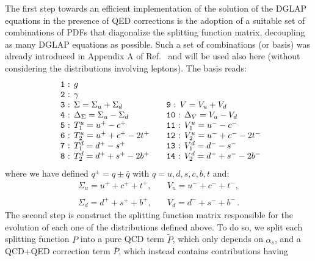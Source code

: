The first step towards an efficient implementation of the solution of
the DGLAP equations in the presence of QED corrections is the adoption
of a suitable set of combinations of PDFs that diagonalize the
splitting function matrix, decoupling as many DGLAP equations as
possible. Such a set of combinations (or basis) was already introduced
in Appendix A of Ref.~\cite{Bertone:2015lqa} and will be used also
here (without considering the distributions involving leptons). The
basis reads:
\begin{equation}\label{eq:EvolBasis}
\begin{array}{ll}
\mbox{\texttt{ 1} : }g & \\
\mbox{\texttt{ 2} : }\gamma & \\
\mbox{\texttt{ 3} : }\displaystyle \Sigma = \Sigma_u + \Sigma_d & \quad
\mbox{\texttt{9} : }\displaystyle V =V_u +  V_d\\
\mbox{\texttt{ 4} : } \displaystyle \Delta_\Sigma = \Sigma_u - \Sigma_d& \quad\displaystyle 
\mbox{\texttt{10} : } \Delta_V = V_u - V_d\\
\mbox{\texttt{ 5} : }T_1^u = u^+ - c^+ &\quad \mbox{\texttt{11} : }V_1^u = u^- - c^- \\
\mbox{\texttt{ 6} : }T_2^u = u^+ + c^+ - 2t^+ &\quad \mbox{\texttt{12} : }V_2^u = u^- + c^- - 2t^-\\
\mbox{\texttt{ 7} : }T_1^d = d^+ - s^+ &\quad \mbox{\texttt{13} : }V_1^d = d^- - s^- \\
\mbox{\texttt{ 8} : }T_2^d = d^+ + s^+ - 2b^+ &\quad \mbox{\texttt{14}
                                               : }V_2^d = d^- + s^- -
                                               2b^-\\
\end{array}
\end{equation}
where we have defined $q^\pm = q\pm\overline{q}$ with
$q = u,d,s,c,b,t$ and:
\begin{equation}
\begin{array}{ll}
\Sigma_u = u^++c^++t^+, &\quad V_u = u^-+c^-+t^-,\\
\\
\Sigma_d = d^++s^++b^+,&\quad V_d = d^-+s^-+b^-\,.
\end{array}
\end{equation}
The second step is construct the splitting function matrix responsible
for the evolution of each one of the distributions defined above. To
do so, we split each splitting function $P$ into a pure QCD term
$\widetilde{P}$, which only depends on $\alpha_s$, and a QCD+QED
correction term $\bar{P}$, which instead contains contributions having
